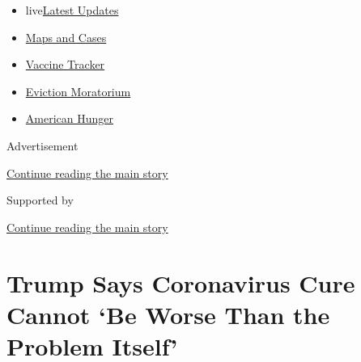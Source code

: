 \begin{itemize}
\tightlist
\item
  live\href{https://www.nytimes3xbfgragh.onion/2020/09/09/world/covid-19-coronavirus.html?name=styln-coronavirus-national\&region=TOP_BANNER\&block=storyline_menu_recirc\&action=click\&pgtype=Article\&impression_id=28c3f370-f299-11ea-9ee4-4b0f9d7721fd\&variant=undefined}{Latest
  Updates}
\item
  \href{https://www.nytimes3xbfgragh.onion/interactive/2020/us/coronavirus-us-cases.html?name=styln-coronavirus-national\&region=TOP_BANNER\&block=storyline_menu_recirc\&action=click\&pgtype=Article\&impression_id=28c3f371-f299-11ea-9ee4-4b0f9d7721fd\&variant=undefined}{Maps
  and Cases}
\item
  \href{https://www.nytimes3xbfgragh.onion/interactive/2020/science/coronavirus-vaccine-tracker.html?name=styln-coronavirus-national\&region=TOP_BANNER\&block=storyline_menu_recirc\&action=click\&pgtype=Article\&impression_id=28c3f372-f299-11ea-9ee4-4b0f9d7721fd\&variant=undefined}{Vaccine
  Tracker}
\item
  \href{https://www.nytimes3xbfgragh.onion/2020/09/02/your-money/eviction-moratorium-covid.html?name=styln-coronavirus-national\&region=TOP_BANNER\&block=storyline_menu_recirc\&action=click\&pgtype=Article\&impression_id=28c3f373-f299-11ea-9ee4-4b0f9d7721fd\&variant=undefined}{Eviction
  Moratorium}
\item
  \href{https://www.nytimes3xbfgragh.onion/interactive/2020/09/02/magazine/food-insecurity-hunger-us.html?name=styln-coronavirus-national\&region=TOP_BANNER\&block=storyline_menu_recirc\&action=click\&pgtype=Article\&impression_id=28c3f374-f299-11ea-9ee4-4b0f9d7721fd\&variant=undefined}{American
  Hunger}
\end{itemize}

Advertisement

\protect\hyperlink{after-top}{Continue reading the main story}

Supported by

\protect\hyperlink{after-sponsor}{Continue reading the main story}

\hypertarget{trump-says-coronavirus-cure-cannot-be-worse-than-the-problem-itself}{%
\section{Trump Says Coronavirus Cure Cannot `Be Worse Than the Problem
Itself'}\label{trump-says-coronavirus-cure-cannot-be-worse-than-the-problem-itself}}

